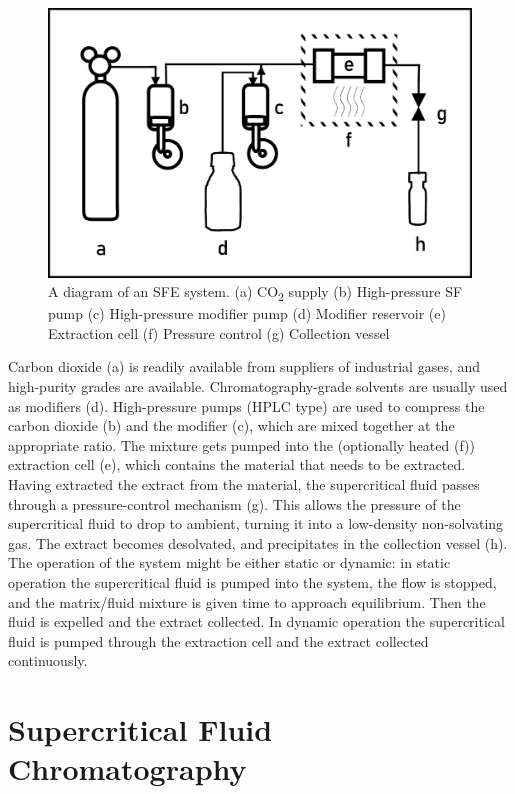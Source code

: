 \begin{figure}
\centering
\includegraphics[width=\textwidth]{Figures/SFE_System}
\decoRule

\caption[SFE system diagram]{A diagram of an SFE system. (a) CO\textsubscript{2} supply (b)
High-pressure SF pump (c) High-pressure modifier pump (d) Modifier reservoir (e)
Extraction cell (f) Pressure control (g) Collection vessel}

\label{fig:sfediagram}
\end{figure}

Carbon dioxide (a) is readily available from suppliers of industrial gases, and
high-purity grades are available. Chromatography-grade solvents are usually used
as modifiers (d). High-pressure pumps (HPLC type) are used to compress the
carbon dioxide (b) and the modifier (c), which are mixed together at the
appropriate ratio. The mixture gets pumped into the (optionally heated (f))
extraction cell (e), which contains the material that needs to be extracted.
Having extracted the extract from the material, the supercritical fluid passes
through a pressure-control mechanism (g). This allows the pressure of the
supercritical fluid to drop to ambient, turning it into a low-density
non-solvating gas. The extract becomes desolvated, and precipitates in the
collection vessel (h). The operation of the system might be either static or
dynamic: in static operation the supercritical fluid is pumped into the system,
the flow is stopped, and the matrix/fluid mixture is given time to approach
equilibrium. Then the fluid is expelled and the extract collected.
In dynamic operation the supercritical fluid is pumped through the extraction
cell and the extract collected continuously. 


\section{Supercritical Fluid Chromatography}

